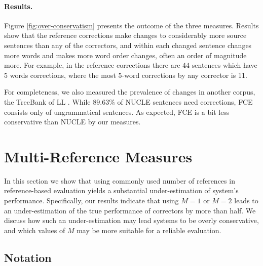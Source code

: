 \documentclass[letter,11pt]{article}
\begin{document}
\paragraph{Results.}
Figure \ref{fig:over-conservatism} presents the outcome of the three measures. 
Results show that the reference corrections make changes to considerably more source sentences than any of the correctors, and within each changed sentence changes more words and makes more word order changes, often an order of magnitude more. For example, in the reference corrections there are 44 sentences which have 5 words corrections, where the most 5-word corrections by any corrector is 11.

For completeness, we also measured the prevalence of changes in
another corpus, the TreeBank of LL \cite[FCE]{yannakoudakis2011new}.
While $89.63\%$ of NUCLE sentences need corrections, FCE consists only of ungrammatical sentences. As expected, FCE is a bit less conservative than NUCLE by our measures.

		\section{Multi-Reference Measures}\label{sec:increase-reference}
		
		In this section we show that using commonly used number of references in reference-based evaluation yields a substantial under-estimation of system's performance. Specifically, our results indicate that using $M=1$ or $M=2$ leads to an under-estimation of the true performance of correctors by more than half.
		We discuss how such an under-estimation may lead systems to be overly conservative, and which values of $M$ may be more suitable for a reliable evaluation.
		
		
		
		\subsection{Notation}
		
\end{document}
